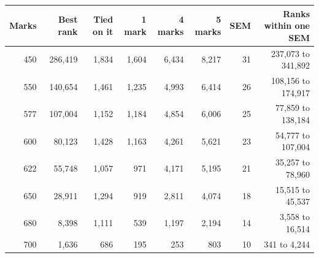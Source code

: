 {\small
\begin{tabular}{rrrrrrrr}
\toprule
Marks & Best rank & Tied on it & 1 mark & 4 marks & 5 marks & SEM & Ranks within one SEM \\
\midrule
450 & 286,419 & 1,834 & 1,604 & 6,434 & 8,217 & 31 & 237,073 to 341,892 \\
550 & 140,654 & 1,461 & 1,235 & 4,993 & 6,414 & 26 & 108,156 to 174,917 \\
577 & 107,004 & 1,152 & 1,184 & 4,854 & 6,006 & 25 & 77,859 to 138,184 \\
600 & 80,123 & 1,428 & 1,163 & 4,261 & 5,621 & 23 & 54,777 to 107,004 \\
622 & 55,748 & 1,057 & 971 & 4,171 & 5,195 & 21 & 35,257 to 78,960 \\
650 & 28,911 & 1,294 & 919 & 2,811 & 4,074 & 18 & 15,515 to 45,537 \\
680 & 8,398 & 1,111 & 539 & 1,197 & 2,194 & 14 & 3,558 to 16,514 \\
700 & 1,636 & 686 & 195 & 253 & 803 & 10 & 341 to 4,244 \\
\bottomrule
\end{tabular}}
